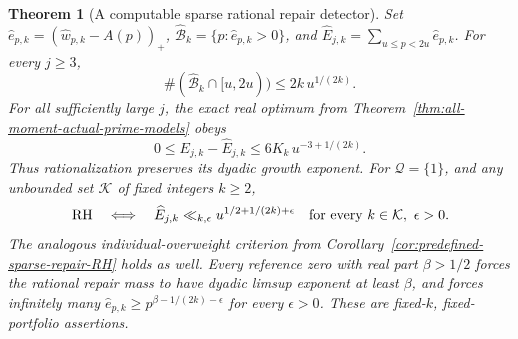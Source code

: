 \documentclass[11pt]{article}
\newtheorem{theorem}{Theorem}[section]
\theoremstyle{definition}
\begin{document}
\begin{theorem}[A computable sparse rational repair detector]
Set $\widehat e_{p,k}=(\widehat w_{p,k}-A(p))_+$,
$\widehat{\mathcal B}_k=\{p:\widehat e_{p,k}>0\}$, and
$\widehat E_{j,k}=\sum_{u\le p<2u}\widehat e_{p,k}$.
For every $j\ge3$,
\begin{equation}
 \#(\widehat{\mathcal B}_k\cap[u,2u))
                              \le2k\,u^{1/(2k)}.
 \label{eq:rational-model-sparse-repair-count}
\end{equation}
For all sufficiently large $j$, the exact real optimum from
Theorem~\ref{thm:all-moment-actual-prime-models} obeys
\begin{equation}
 0\le E_{j,k}-\widehat E_{j,k}
                \le6K_k\,u^{-3+1/(2k)}.
 \label{eq:rational-real-overweight-comparison}
\end{equation}
Thus rationalization preserves its dyadic growth exponent.
For $\mathcal Q=\{1\}$, and any unbounded set $\mathcal K$
of fixed integers $k\ge2$,
\begin{equation}
 {\rm RH}\quad\Longleftrightarrow\quad
 \widehat E_{j,k}\ll_{k,\epsilon}
             u^{1/2+1/(2k)+\epsilon}
       \quad\text{for every }k\in\mathcal K,\ \epsilon>0 .
 \label{eq:computable-rational-repair-RH}
\end{equation}
The analogous individual-overweight criterion from
Corollary~\ref{cor:predefined-sparse-repair-RH} holds as well.
Every reference zero with real part $\beta>1/2$ forces the
rational repair mass to have dyadic limsup exponent at least
$\beta$, and forces infinitely many
$\widehat e_{p,k}\ge p^{\beta-1/(2k)-\epsilon}$ for every
$\epsilon>0$. These are fixed-$k$, fixed-portfolio assertions.
\end{theorem}
\end{document}

